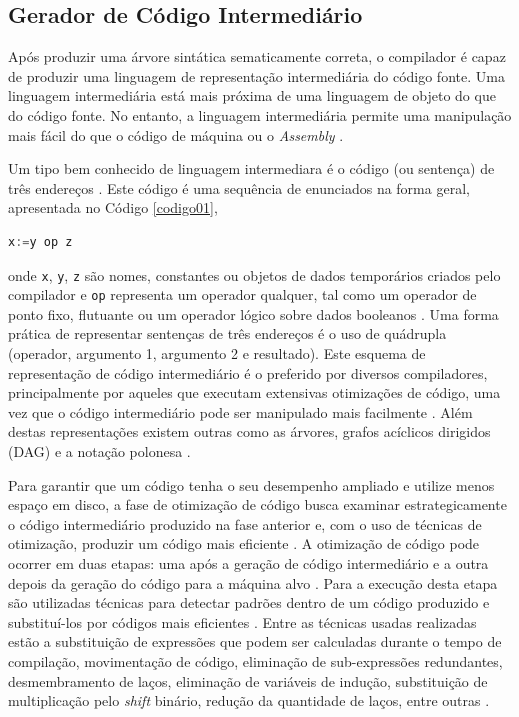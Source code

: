 \subsection{Gerador de Código Intermediário}

Após produzir uma árvore sintática sematicamente correta, o compilador é capaz de
 produzir uma linguagem de representação intermediária do código fonte. Uma linguagem 
intermediária está mais próxima de uma linguagem de objeto do que do código fonte. 
No entanto, a linguagem  intermediária permite uma manipulação mais fácil do que o 
código de máquina ou o \textit{Assembly} \cite[pág. 8]{ref25}. 

Um tipo bem conhecido de linguagem intermediara é o código (ou sentença) de três 
endereços \cite[pág. 247]{ref26}. Este código é uma sequência de enunciados na forma geral, apresentada 
 no Código \ref{codigo01},

\begin{lstlisting}[language=C++,caption={Código de três endereços},
											label=codigo01]
   x:=y op z
\end{lstlisting}
onde \texttt{x}, \texttt{y}, \texttt{z} são nomes, constantes ou objetos de dados 
temporários criados pelo compilador e \texttt{op} representa um operador qualquer,
 tal como um operador de ponto fixo, flutuante ou um operador lógico sobre dados
 booleanos \cite[pág. 201]{ref6}. Uma forma prática de representar sentenças de três endereços é o uso
 de quádrupla (operador, argumento 1, argumento 2 e resultado). 
Este esquema de representação de código intermediário é o preferido por diversos
 compiladores, principalmente por aqueles que executam extensivas otimizações de
 código, uma vez que o código intermediário pode ser manipulado mais 
facilmente \cite[pág. 604]{ref5}. Além destas representações existem outras como as 
árvores, grafos acíclicos dirigidos (DAG) e a notação polonesa \cite[pág. 96]{ref29}.

Para garantir que um código tenha o seu desempenho ampliado e utilize menos 
espaço em disco, a fase de otimização de código busca examinar 
estrategicamente o código intermediário produzido na fase anterior e, com o 
uso de técnicas de otimização, produzir um código mais eficiente \cite[pág. 796]{ref30}
. A otimização de código pode ocorrer em duas etapas: uma após a geração de 
código intermediário e a outra depois da geração do código para a máquina 
alvo \cite[pág. 34]{ref6}. 
Para a execução desta etapa são utilizadas técnicas para detectar 
padrões dentro de um código produzido e substituí-los por códigos mais
 eficientes \cite[pág. 604]{ref5}. Entre as técnicas usadas realizadas estão a 
substituição de expressões que podem ser calculadas durante o tempo 
de compilação, movimentação de código, eliminação de sub-expressões 
redundantes, desmembramento de laços, eliminação de variáveis de indução, 
substituição de multiplicação pelo \textit{shift} binário, redução da 
quantidade de laços, entre outras \cite[pág. 796]{ref30}.

